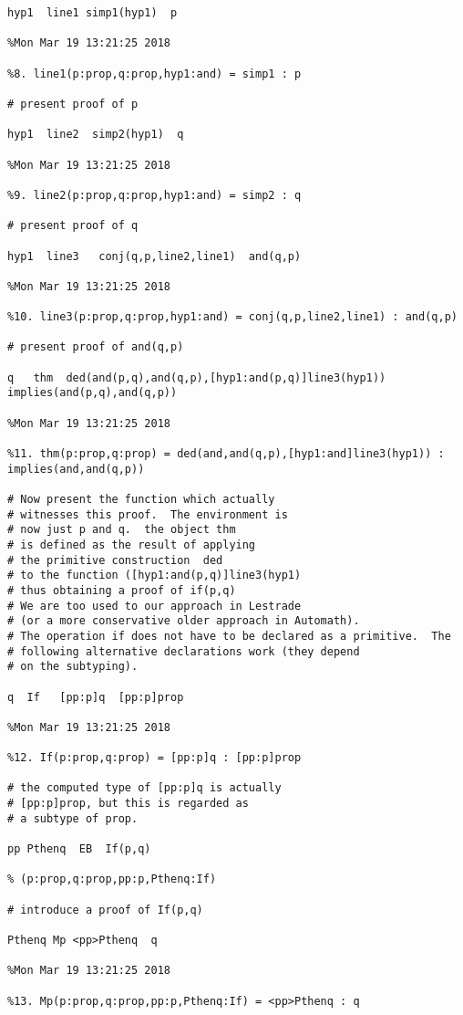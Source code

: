 \documentclass[12pt]{article}
\begin{document}
\begin{verbatim}
hyp1  line1 simp1(hyp1)  p

%Mon Mar 19 13:21:25 2018

%8. line1(p:prop,q:prop,hyp1:and) = simp1 : p

# present proof of p

hyp1  line2  simp2(hyp1)  q

%Mon Mar 19 13:21:25 2018

%9. line2(p:prop,q:prop,hyp1:and) = simp2 : q

# present proof of q

hyp1  line3   conj(q,p,line2,line1)  and(q,p)

%Mon Mar 19 13:21:25 2018

%10. line3(p:prop,q:prop,hyp1:and) = conj(q,p,line2,line1) : and(q,p)

# present proof of and(q,p)

q   thm  ded(and(p,q),and(q,p),[hyp1:and(p,q)]line3(hyp1))       implies(and(p,q),and(q,p))

%Mon Mar 19 13:21:25 2018

%11. thm(p:prop,q:prop) = ded(and,and(q,p),[hyp1:and]line3(hyp1)) : implies(and,and(q,p))

# Now present the function which actually
# witnesses this proof.  The environment is
# now just p and q.  the object thm
# is defined as the result of applying
# the primitive construction  ded
# to the function ([hyp1:and(p,q)]line3(hyp1)
# thus obtaining a proof of if(p,q)
# We are too used to our approach in Lestrade
# (or a more conservative older approach in Automath).
# The operation if does not have to be declared as a primitive.  The 
# following alternative declarations work (they depend
# on the subtyping).

q  If   [pp:p]q  [pp:p]prop

%Mon Mar 19 13:21:25 2018

%12. If(p:prop,q:prop) = [pp:p]q : [pp:p]prop

# the computed type of [pp:p]q is actually
# [pp:p]prop, but this is regarded as
# a subtype of prop.

pp Pthenq  EB  If(p,q)

% (p:prop,q:prop,pp:p,Pthenq:If)

# introduce a proof of If(p,q)

Pthenq Mp <pp>Pthenq  q

%Mon Mar 19 13:21:25 2018

%13. Mp(p:prop,q:prop,pp:p,Pthenq:If) = <pp>Pthenq : q


\end{verbatim}
\end{document}
